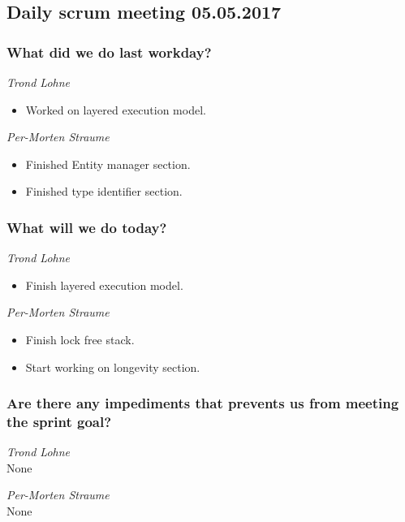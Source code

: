 \documentclass{article}
\begin{document}
\begin{center}
\subsection*{Daily scrum meeting 05.05.2017}
\end{center}
\bigskip


\subsubsection*{What did we do last workday?}

\noindent\textit{Trond Lohne}
\begin{itemize}
	\item
	Worked on layered execution model.
\end{itemize}

\medskip

\noindent\textit{Per-Morten Straume}
\begin{itemize}
	\item
	Finished Entity manager section.

	\item
	Finished type identifier section.
\end{itemize}


\subsubsection*{What will we do today?}

\noindent\textit{Trond Lohne}
\begin{itemize}
	\item
	Finish layered execution model.
\end{itemize}

\medskip

\noindent\textit{Per-Morten Straume}
\begin{itemize}
	\item
	Finish lock free stack.

	\item
	Start working on longevity section.
\end{itemize}


\subsubsection*{Are there any impediments that prevents us from meeting the sprint goal?}

\noindent\textit{Trond Lohne}\\
None

\medskip

\noindent\textit{Per-Morten Straume}\\
None
\end{document}
